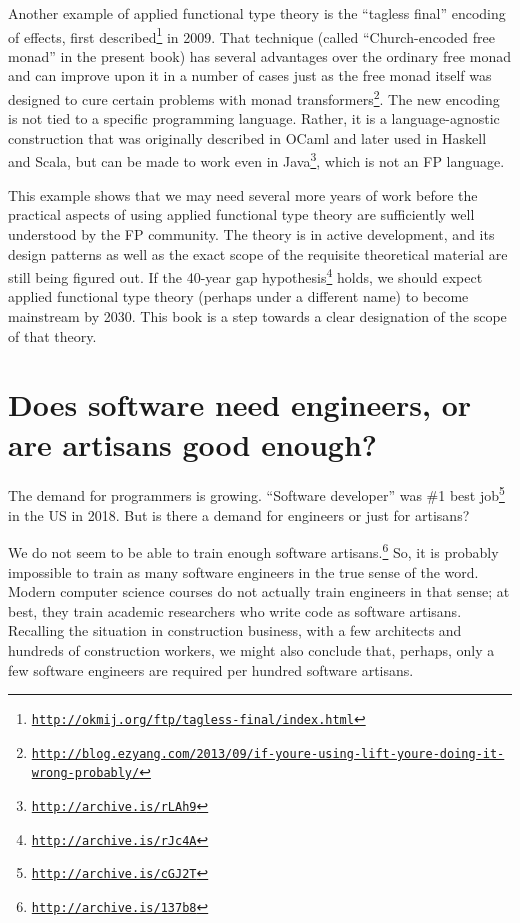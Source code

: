 Another example of applied functional type theory is the  \textsf{``}tagless
final\textsf{''} encoding of effects, first described\footnote{\texttt{\href{http://okmij.org/ftp/tagless-final/index.html}{http://okmij.org/ftp/tagless-final/index.html}}}
in 2009. That technique (called \textsf{``}Church-encoded free monad\textsf{''}
in the present book) has several advantages over the ordinary free
monad and can improve upon it in a number of cases \textemdash{} just
as the free monad itself was designed to cure certain problems with
monad transformers\footnote{\texttt{\href{http://blog.ezyang.com/2013/09/if-youre-using-lift-youre-doing-it-wrong-probably/}{http://blog.ezyang.com/2013/09/if-youre-using-lift-youre-doing-it-wrong-probably/}}}.
The new encoding is not tied to a specific programming language. Rather,
it is a language-agnostic construction that was originally described
in OCaml and later used in Haskell and Scala, but can be made to work
even in Java\footnote{\texttt{\href{http://archive.is/rLAh9}{http://archive.is/rLAh9}}},
which is not an FP language.

This example shows that we may need several more years of work before
the practical aspects of using applied functional type theory are
sufficiently well understood by the FP community. The theory is in
active development, and its design patterns \textemdash{} as well
as the exact scope of the requisite theoretical material \textemdash{}
are still being figured out. If the 40-year gap hypothesis\footnote{\texttt{\href{http://archive.is/rJc4A}{http://archive.is/rJc4A}}}
holds, we should expect applied functional type theory (perhaps under
a different name) to become mainstream by 2030. This book is a step
towards a clear designation of the scope of that theory.

\section{Does software need engineers, or are artisans good enough? }

The demand for programmers is growing. \textsf{``}Software developer\textsf{''} was
\#1 best job\footnote{\texttt{\href{http://archive.is/cGJ2T}{http://archive.is/cGJ2T}}}
in the US in 2018. But is there a demand for engineers or just for
artisans?

We do not seem to be able to train enough software artisans.\footnote{\texttt{\href{http://archive.is/137b8}{http://archive.is/137b8}}}
So, it is probably impossible to train as many software engineers
in the true sense of the word. Modern computer science courses do
not actually train engineers in that sense; at best, they train academic
researchers who write code as software artisans. Recalling the situation
in construction business, with a few architects and hundreds of construction
workers, we might also conclude that, perhaps, only a few software
engineers are required per hundred software artisans.

